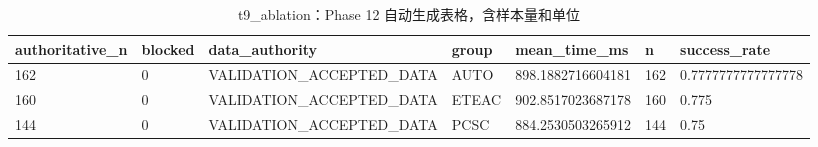 \begin{table}[htbp]
\centering
\caption{t9_ablation：Phase 12 自动生成表格，含样本量和单位}
\begin{tabular}{lllllll}
\hline
authoritative_n & blocked & data_authority & group & mean_time_ms & n & success_rate \\
\hline
162 & 0 & VALIDATION\_ACCEPTED\_DATA & AUTO & 898.1882716604181 & 162 & 0.7777777777777778 \\
160 & 0 & VALIDATION\_ACCEPTED\_DATA & ETEAC & 902.8517023687178 & 160 & 0.775 \\
144 & 0 & VALIDATION\_ACCEPTED\_DATA & PCSC & 884.2530503265912 & 144 & 0.75 \\
\hline
\end{tabular}
\end{table}
